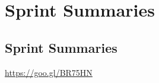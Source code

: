 \graphicspath{{Appendix2/Figs/Vector/}{Appendix2/Figs/}}

\chapter{Sprint Summaries}

\section*{Sprint Summaries}
\label{appendix:sprints}


\url{https://goo.gl/BR75HN}